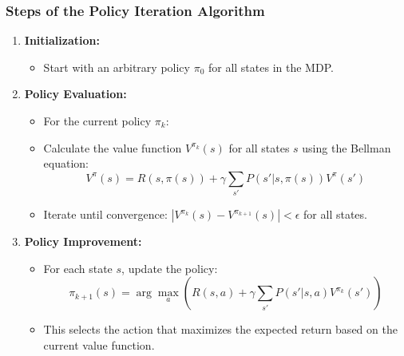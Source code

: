\documentclass[aspectratio=169]{beamer}
\begin{document}
\begin{frame}[fragile]
    \frametitle{Steps of the Policy Iteration Algorithm}
    \begin{enumerate}
        \item \textbf{Initialization:}
        \begin{itemize}
            \item Start with an arbitrary policy \( \pi_0 \) for all states in the MDP.
        \end{itemize}
        
        \item \textbf{Policy Evaluation:}
        \begin{itemize}
            \item For the current policy \( \pi_k \):
            \item Calculate the value function \( V^{\pi_k}(s) \) for all states \( s \) using the Bellman equation:
            \begin{equation}
                V^{\pi}(s) = R(s, \pi(s)) + \gamma \sum_{s'} P(s' | s, \pi(s)) V^{\pi}(s')
            \end{equation}
            \item Iterate until convergence: \( |V^{\pi_k}(s) - V^{\pi_{k+1}}(s)| < \epsilon \) for all states.
        \end{itemize}
        
        \item \textbf{Policy Improvement:}
        \begin{itemize}
            \item For each state \( s \), update the policy:
            \begin{equation}
                \pi_{k+1}(s) = \arg\max_{a} \left( R(s, a) + \gamma \sum_{s'} P(s' | s, a) V^{\pi_k}(s') \right)
            \end{equation}
            \item This selects the action that maximizes the expected return based on the current value function.
        \end{itemize}
    \end{enumerate}
\end{frame}
\end{document}

